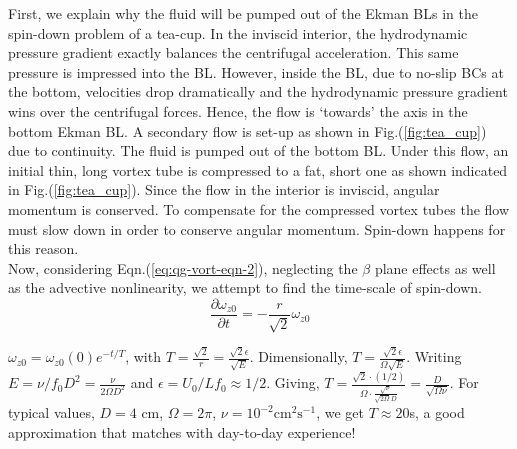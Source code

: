 \documentclass{article}
\newcommand{\pd}[2]{\frac{\partial{#1}}{\partial{#2}}}
\begin{document}
First, we explain why the fluid will be pumped out of the Ekman BLs in the spin-down problem of a tea-cup. In the inviscid interior, the hydrodynamic pressure gradient exactly balances the centrifugal acceleration. This same pressure is impressed into the BL. However, inside the BL, due to no-slip BCs at the bottom, velocities drop dramatically and the hydrodynamic pressure gradient wins over the centrifugal forces. Hence, the flow is `towards' the axis in the bottom Ekman BL. A secondary flow is set-up as shown in Fig.(\ref{fig:tea_cup}) due to continuity. The fluid is pumped out of the bottom BL. Under this flow, an initial thin, long vortex tube is compressed to a fat, short one as shown indicated in Fig.(\ref{fig:tea_cup}). Since the flow in the interior is inviscid, angular momentum is conserved. To compensate for the compressed vortex tubes the flow must slow down in order to conserve angular momentum. Spin-down happens for this reason. \\
%
Now, considering Eqn.(\ref{eq:qg-vort-eqn-2}), neglecting the $\beta$ plane effects as well as the advective nonlinearity, we attempt to find the time-scale of spin-down. 
\begin{equation}
 \pd{\omega_{z0}}{t} = - \frac{r}{\sqrt{2}}\omega_{z0} 
\end{equation}

$\omega_{z0} = \omega_{z0}(0)e^{-t/T}$, with $T = \frac{\sqrt{2}}{r} = \frac{\sqrt{2}\epsilon}{\sqrt{E}}$. Dimensionally, $T = \frac{\sqrt{2}\epsilon}{\Omega\sqrt{E}}$. Writing $E = \nu/f_{0}D^{2} = \frac{\nu}{2\Omega D^{2}}$ and $\epsilon = U_{0}/Lf_{0} \approx 1/2$. Giving, $T = \frac{\sqrt{2}\cdot (1/2)}{\Omega \cdot \frac{\sqrt{\nu}}{\sqrt{2\Omega}D}}  = \frac{D}{\sqrt{\Omega \nu}}$. For typical values, $D = 4$ cm, $\Omega = 2\pi$, $\nu = 10^{-2} \textrm{cm}^{2}\textrm{s}^{-1}$, we get $T \approx 20$s, a good approximation that matches with day-to-day experience!



 \if@openright\cleardoublepage\else\clearpage\fi
 \cleardoublepage
 \pagestyle{empty}
\end{document}
